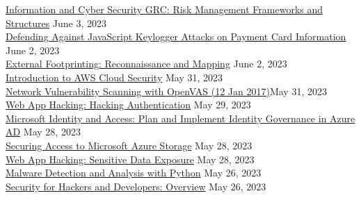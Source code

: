 \documentclass[10pt]{res} %
\begin{document}
\begin{resume}
\href{https://bjdelacruz.dev/files/certificates/pluralsight/Information_and_Cyber_Security_GRC_Risk_Management_Frameworks_and_Structures.pdf}{\color{blue}Information and Cyber Security GRC: Risk Management Frameworks and Structures} \hfill June 3, 2023 \\
\href{https://bjdelacruz.dev/files/certificates/pluralsight/Defending_Against_JavaScript_Keylogger_Attacks_on_Payment_Card_Information.pdf}{\color{blue}Defending Against JavaScript Keylogger Attacks on Payment Card Information} \hfill June 2, 2023 \\
\href{https://bjdelacruz.dev/files/certificates/pluralsight/External_Footprinting_Reconnaissance_and_Mapping.pdf}{\color{blue}External Footprinting: Reconnaissance and Mapping} \hfill June 2, 2023 \\
\href{https://bjdelacruz.dev/files/certificates/pluralsight/Introduction_to_AWS_Cloud_Security.pdf}{\color{blue}Introduction to AWS Cloud Security} \hfill May 31, 2023 \\
\href{https://bjdelacruz.dev/files/certificates/pluralsight/Network_Vulnerability_Scanning_with_OpenVAS_12_Jan_2017.pdf}{\color{blue}Network Vulnerability Scanning with OpenVAS (12 Jan 2017)}\hfill May 31, 2023 \\
\href{https://bjdelacruz.dev/files/certificates/pluralsight/Web_App_Hacking_Hacking_Authentication.pdf}{\color{blue}Web App Hacking: Hacking Authentication} \hfill May 29, 2023 \\
\href{https://bjdelacruz.dev/files/certificates/pluralsight/Microsoft_Identity_and_Access_Plan_and_Implement_Identity_Governance_in_Azure_AD.pdf}{\color{blue}Microsoft Identity and Access: Plan and Implement Identity Governance in Azure AD} \hfill May 28, 2023 \\
\href{https://bjdelacruz.dev/files/certificates/pluralsight/Securing_Access_to_Microsoft_Azure_Storage.pdf}{\color{blue}Securing Access to Microsoft Azure Storage} \hfill May 28, 2023 \\
\href{https://bjdelacruz.dev/files/certificates/pluralsight/Web_App_Hacking_Sensitive_Data_Exposure.pdf}{\color{blue}Web App Hacking: Sensitive Data Exposure} \hfill May 28, 2023 \\
\href{https://bjdelacruz.dev/files/certificates/pluralsight/Malware_Detection_and_Analysis_with_Python.pdf}{\color{blue}Malware Detection and Analysis with Python} \hfill May 26, 2023 \\
\href{https://bjdelacruz.dev/files/certificates/pluralsight/Security_for_Hackers_and_Developers_Overview.pdf}{\color{blue}Security for Hackers and Developers: Overview} \hfill May 26, 2023 \\

\end{resume}
\end{document}
